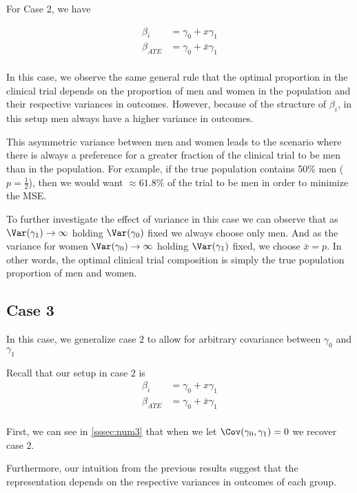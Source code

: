 For Case 2, we have 

\begin{align*}
	\beta_i &=  \gamma_0 + x \gamma_1 \\
	\beta_{ATE} &=  \gamma_0 + \bar{x} \gamma_1 \\
\end{align*}


In this case, we observe the same general rule that the optimal proportion in the clinical trial depends on the proportion of men and women in the population and their respective variances in outcomes.
However, because of the structure of $\beta_ i$, in this setup men always have a higher variance in outcomes.

This asymmetric variance between men and women leads to the scenario where there is always a preference for a greater fraction of the clinical trial to be men than in the population. 
For example, if the true population contains 50\% men ($p = \frac{1}{2}$), then we would want $\approx 61.8 \%$ of the trial to be men in order to minimize the MSE.

To further investigate the effect of variance in this case we can observe that as $\Var(\gamma_1) \to \infty$ holding $\Var(\gamma_0)$ fixed we always choose only men.
And as the variance for women $\Var(\gamma_0) \to \infty$ holding $\Var(\gamma_1)$ fixed, we choose $\bar{x} = p$. In other words, the optimal clinical trial composition is simply the true population proportion of men and women.

\subsection*{Case 3}

In this case, we generalize case $2$ to allow for arbitrary covariance between $\gamma_0$ and $\gamma_1$

Recall that our setup in case  $2$ is
\begin{align*}
	\beta_i &=  \gamma_0 + x \gamma_1 \\
	\beta_{ATE} &=  \gamma_0 + \bar{x} \gamma_1 \\
\end{align*}

First, we can see in \ref{sssec:num3} that when we let  $\Cov(\gamma_0, \gamma_1) = 0$ we recover case 2.

Furthermore, our intuition from the previous results suggest that the representation depends on the respective variances in outcomes of each group.


